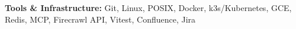             \textbf{Tools \& Infrastructure: }{Git, Linux, POSIX, Docker, k3s/Kubernetes, GCE, Redis, MCP, Firecrawl API, Vitest, Confluence, Jira}
